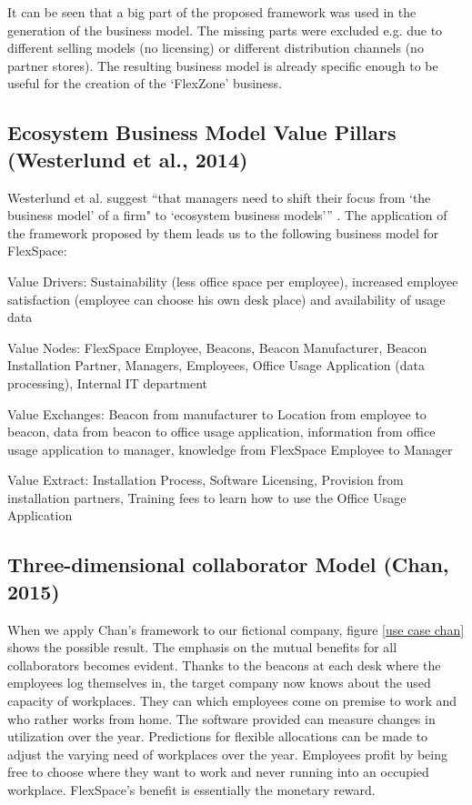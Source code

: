 
	It can be seen that a big part of the proposed framework was used in the generation of the business model. The missing parts were excluded e.g. due to different selling models (no licensing) or different distribution channels (no partner stores). The resulting business model is already specific enough to be useful for the creation of the `FlexZone' business. 

	\subsection{Ecosystem Business Model Value Pillars (Westerlund et al., 2014)}
		Westerlund et al. suggest ``that managers need to shift their focus from `the business model' of a firm" to `ecosystem business models''' \cite[p. 8]{westerlund}. The application of the framework proposed by them leads us to the following business model for FlexSpace:

		Value Drivers: Sustainability (less office space per employee), increased employee satisfaction (employee can choose his own desk place) and availability of usage data

		Value Nodes: FlexSpace Employee, Beacons, Beacon Manufacturer, Beacon Installation Partner, Managers, Employees, Office Usage Application (data processing), Internal IT department

		Value Exchanges: Beacon from manufacturer to Location from employee to beacon, data from beacon to office usage application, information from office usage application to manager, knowledge from FlexSpace Employee to Manager

		Value Extract: Installation Process, Software Licensing, Provision from installation partners, Training fees to learn how to use the Office Usage Application

	\subsection{Three-dimensional collaborator Model (Chan, 2015)}

	When we apply Chan's framework to our fictional company, figure \ref{use case chan} shows the possible result. The emphasis on the mutual benefits for all collaborators becomes evident. Thanks to the beacons at each desk where the employees log themselves in, the target company now knows about the used capacity of workplaces. They can which employees come on premise to work and who rather works from home. The software provided can measure changes in utilization over the year. Predictions for flexible allocations can be made to adjust the varying need of workplaces over the year. Employees profit by being free to choose where they want to work and never running into an occupied workplace. FlexSpace's benefit is essentially the monetary reward.

